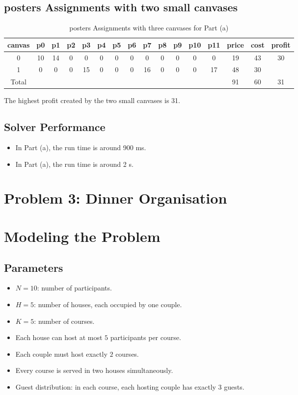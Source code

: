 \documentclass{article}
\begin{document}
\subsection{posters Assignments with two small canvases}

\begin{table}[H]
\centering
\caption{posters Assignments with three canvases for Part (a)}
\small
\begin{tabular}{c|cccccccccccc|c|c|c}
\toprule
canvas & p0 & p1 & p2 & p3 & p4  & p5 & p6 & p7 & p8 & p9 & p10 & p11 & price & cost & profit\\
\midrule
0 & 10 & 14 & 0 & 0 & 0 & 0 & 0 & 0 & 0 & 0 & 0 & 0 & 19 & 43 & 30\\
1 & 0 & 0 & 0 & 15 & 0 & 0 & 0 & 16 & 0 & 0 & 0 & 17 & 48 & 30 &\\
\midrule
Total & & & & & & & & & & & & & 91 & 60 & 31\\
\bottomrule
\end{tabular}
\end{table}
The highest profit created by the two small canvases is 31.

\subsection{Solver Performance}

\begin{itemize}
    \item    
    In Part (a), the run time is around 900 ms.
    \item 
    In Part (a), the run time is around 2 s.
\end{itemize}

\vspace{1em}
\setcounter{section}{0}
\section*{Problem 3: Dinner Organisation}

\section{Modeling the Problem}

\subsection{Parameters}
\begin{itemize}
  \item $N = 10$: number of participants.
  \item $H = 5$: number of houses, each occupied by one couple.
  \item $K = 5$: number of courses.
  \item Each house can host at most $5$ participants per course.
  \item Each couple must host exactly $2$ courses.
  \item Every course is served in two houses simultaneously.
  \item Guest distribution: in each course, each hosting couple has exactly 3 guests.
\end{itemize}
\end{document}

